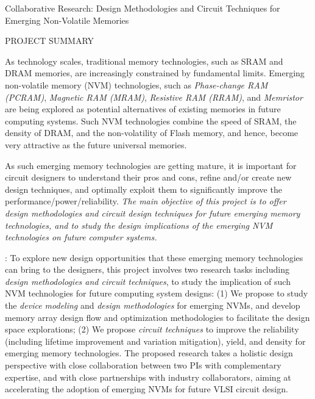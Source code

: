 \documentclass[11pt,letterpaper]{article}
\begin{document}
\begin{center}
{\Large Collaborative Research: Design Methodologies and Circuit Techniques for Emerging Non-Volatile Memories}\\
\end{center}
\begin{center}
{\large  PROJECT SUMMARY} \\
\end{center}

\normalsize
As technology scales, traditional memory technologies, such as SRAM and DRAM memories, are increasingly constrained by fundamental limits. Emerging non-volatile memory (NVM) technologies, such as \textit{Phase-change RAM (PCRAM)}, \textit{Magnetic RAM (MRAM)},  \textit{Resistive RAM (RRAM)}, and \textit{Memristor} are being explored as potential alternatives of existing memories in future computing systems. Such NVM technologies combine the speed of SRAM, the density of DRAM, and the non-volatility of Flash memory, and hence, become very attractive as the future universal memories. 

As such emerging memory technologies are getting mature, it is important for circuit designers to understand their pros and cons, refine and/or create new design techniques, and optimally exploit them to significantly improve the performance/power/reliability. \textit{The main objective of this project is to offer design methodologies and circuit design techniques for future emerging memory technologies, and to study the design implications of the emerging NVM technologies on future computer systems.}

{}: 
To explore new design opportunities that these emerging memory technologies can bring to the designers,  this project involves two research tasks including \emph{design methodologies and circuit techniques}, to study the implication of such NVM technologies for future computing system designs: (1) We propose to study the \textit{device modeling} and \textit{design methodologies} for emerging NVMs, and develop memory array design flow and optimization methodologies to facilitate the design space explorations; (2) We propose \textit{circuit techniques} to improve the reliability (including lifetime improvement and variation mitigation), yield,
and density for emerging memory technologies. The proposed research takes a holistic design perspective with close collaboration between two PIs with complementary expertise, and with close partnerships with industry collaborators, aiming at accelerating the adoption of emerging NVMs for future VLSI circuit design.
\end{document}
